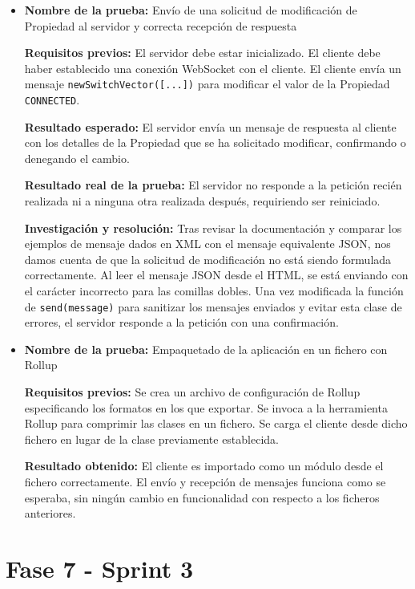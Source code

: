 \begin{itemize}
	\item \textbf{Nombre de la prueba:} Envío de una solicitud de modificación de Propiedad al servidor y correcta recepción de respuesta
	
\textbf{Requisitos previos:} El servidor debe estar inicializado. El cliente debe haber establecido una conexión WebSocket con el cliente. El cliente envía un mensaje \texttt{newSwitchVector([...])} para modificar el valor de la Propiedad \texttt{CONNECTED}.

\textbf{Resultado esperado:} El servidor envía un mensaje de respuesta al cliente con los detalles de la Propiedad que se ha solicitado modificar, confirmando o denegando el cambio.

\textbf{Resultado real de la prueba:} El servidor no responde a la petición recién realizada ni a ninguna otra realizada después, requiriendo ser reiniciado.

\textbf{Investigación y resolución:} Tras revisar la documentación y comparar los ejemplos de mensaje dados en XML con el mensaje equivalente JSON, nos damos cuenta de que la solicitud de modificación no está siendo formulada correctamente. Al leer el mensaje JSON desde el HTML, se está enviando con el carácter incorrecto para las comillas dobles. Una vez modificada la función de \texttt{send(message)} para sanitizar los mensajes enviados y evitar esta clase de errores, el servidor responde a la petición con una confirmación.


\item \textbf{Nombre de la prueba:} Empaquetado de la aplicación en un fichero con Rollup

\textbf{Requisitos previos:} Se crea un archivo de configuración de Rollup especificando los formatos en los que exportar. Se invoca a la herramienta Rollup para comprimir las clases en un fichero. Se carga el cliente desde dicho fichero en lugar de la clase previamente establecida.

\textbf{Resultado obtenido:} El cliente es importado como un módulo desde el fichero correctamente. El envío y recepción de mensajes funciona como se esperaba, sin ningún cambio en funcionalidad con respecto a los ficheros anteriores.
\end{itemize}


\newpage

\section{Fase 7 - Sprint 3}

